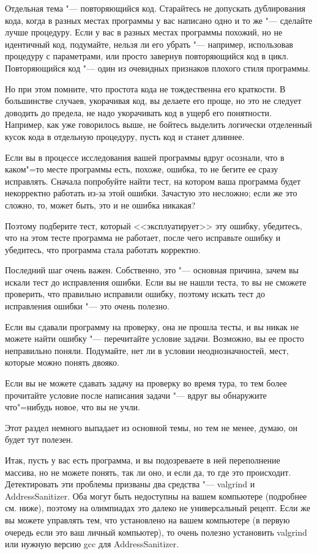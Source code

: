 \documentclass[a4paper,10pt]{problems}
\begin{document}
Отдельная тема "--- повторяющийся код. 
Старайтесь не допускать дублирования кода, когда в разных местах программы у вас написано одно и то же "--- сделайте лучше процедуру.
Если у вас в разных местах программы похожий, но не идентичный код, подумайте, нельзя ли его убрать "--- например, использовав процедуру с параметрами,
или просто завернув повторяющийся код в цикл. 
Повторяющийся код "--- один из очевидных признаков плохого стиля программы.

Но при этом помните, что простота кода не тождественна его краткости. 
В большинстве случаев, укорачивая код, вы делаете его проще, но это не следует доводить до предела, не надо укорачивать код в ущерб его понятности.
Например, как уже говорилось выше, не бойтесь выделить логически отделенный кусок кода в отдельную процедуру, пусть код и станет длиннее.

Если вы в процессе исследования вашей программы вдруг осознали, что в каком"=то месте программы есть, похоже, ошибка, то не бегите ее сразу исправлять.
Сначала попробуйте найти тест, на котором ваша программа будет некорректно работать из-за этой ошибки.
Зачастую это несложно; если же это сложно, то, может быть, это и не ошибка никакая? 

Поэтому подберите тест, который <<эксплуатирует>> эту ошибку, убедитесь, что на этом тесте программа не работает, после чего исправьте ошибку и убедитесь,
что программа стала работать корректно.

Последний шаг очень важен. Собственно, это "--- основная причина, зачем вы искали тест до исправления ошибки. 
Если вы не нашли теста, то вы не сможете проверить, что правильно исправили ошибку, поэтому искать тест до исправления ошибки "--- это очень полезно.

Если вы сдавали программу на проверку, она не прошла тесты, и вы никак не можете найти ошибку "--- перечитайте условие задачи. 
Возможно, вы ее просто неправильно поняли.
Подумайте, нет ли в условии неоднозначностей, мест, которые можно понять двояко.

Если вы не можете сдавать задачу на проверку во время тура, то тем более прочитайте условие после написания задачи "--- вдруг вы обнаружите что"=нибудь
новое, что вы не учли.

Этот раздел немного выпадает из основной темы, но тем не менее, думаю, он будет тут полезен.

Итак, пусть у вас есть программа, и вы подозреваете в ней переполнение массива, но не можете понять, так ли оно, и если да, то где это происходит.
Детектировать эти проблемы призваны два средства "--- valgrind и AddressSanitizer. 
Оба могут быть недоступны на вашем компьютере (подробнее см. ниже), поэтому на олимпиадах это далеко не универсальный рецепт.
Если же вы можете управлять тем, что установлено на вашем компьютере (в первую очередь если это ваш личный компьютер),
то очень полезно установить valgrind или нужную версию gcc для AddressSanitizer.
\end{document}
